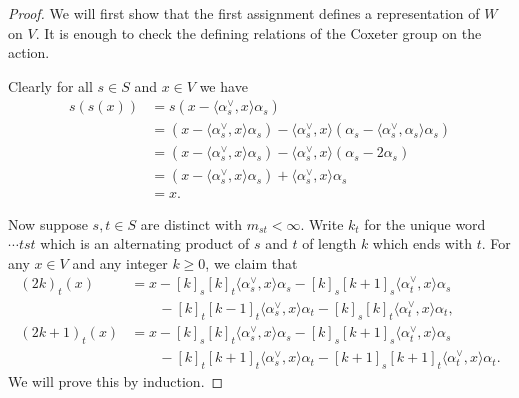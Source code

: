 \documentclass{amsart}
\theoremstyle{plain}
\theoremstyle{definition}
\theoremstyle{remark}
\numberwithin{equation}{section}
\newcommand{\defnemph}[1]{\emph{#1}}
\begin{document}
\begin{proof}
We will first show that the first assignment defines a representation of $W$ on $V$. 
It is enough to check the defining relations of the Coxeter group on the action. 

Clearly for all $s \in S$ and $x \in V$ we have
\begin{align*}
s(s(x))& =s(x-\langle \alpha_s^\vee, x\rangle \alpha_s) \\
& =(x-\langle \alpha_s^\vee, x\rangle \alpha_s)-\langle \alpha_s^\vee, x\rangle (\alpha_s-\langle \alpha_s^\vee,\alpha_s\rangle \alpha_s) \\
& =(x-\langle \alpha_s^\vee, x\rangle \alpha_s)-\langle \alpha_s^\vee, x\rangle (\alpha_s-2\alpha_s) \\
& =(x-\langle \alpha_s^\vee, x\rangle \alpha_s)+\langle \alpha_s^\vee, x\rangle \alpha_s \\
& =x \text{.}
\end{align*}


Now suppose $s,t \in S$ are distinct with $m_{st}<\infty$. 
Write $k_t$ for the unique word $\dotsm tst$ which is an alternating product of $s$ and $t$ of length $k$ which ends with $t$.
For any $x \in V$ and any integer $k \geq 0$, we claim that
\begin{align*}
(2k)_t(x) & =x - [k]_s [k]_t \langle \alpha_s^\vee, x\rangle \alpha_s - [k]_s [k+1]_s \langle \alpha_t^\vee, x\rangle \alpha_s \\
& \quad \quad {} - [k]_t [k-1]_t \langle \alpha_s^\vee, x\rangle \alpha_t - [k]_s [k]_t \langle \alpha_t^\vee, x\rangle \alpha_t \text{,} \\
(2k+1)_t(x)& =x - [k]_s [k]_t \langle \alpha_s^\vee, x\rangle \alpha_s - [k]_s [k+1]_s \langle \alpha_t^\vee, x\rangle \alpha_s \\
& \quad \quad {} - [k]_t [k+1]_t \langle \alpha_s^\vee, x\rangle \alpha_t - [k+1]_s [k+1]_t \langle \alpha_t^\vee, x\rangle \alpha_t \text{.}
\end{align*}
We will prove this by induction. 


\end{proof}
\end{document}
